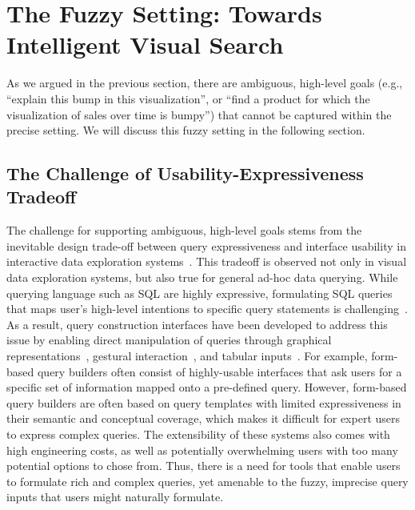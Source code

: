 \documentclass[11pt]{article}
\begin{document}
\section{The Fuzzy Setting: Towards Intelligent Visual Search}\label{sec:vague}
\par As we argued in the previous section, 
there are ambiguous, high-level goals (e.g., 
``explain this bump in this visualization'', or ``find a product
for which the visualization of sales over time is bumpy'') that
cannot be captured within the precise setting. We will discuss this fuzzy setting in the following section. 


\subsection{The Challenge of Usability-Expressiveness Tradeoff}
\par The challenge for supporting ambiguous, 
high-level goals stems from the 
inevitable design trade-off between 
query expressiveness and interface 
usability in interactive data exploration 
systems~\cite{Jagadish2007,Morton2014}. 
This tradeoff is observed not only in 
visual data exploration systems, 
but also true for general ad-hoc data querying. 
While querying language such as SQL are highly expressive, 
formulating SQL queries that maps user's high-level intentions 
to specific query statements is challenging~\cite{Jagadish2007,Khoussainova2010}. 
As a result, query construction interfaces 
have been developed to address this issue by enabling 
direct manipulation of queries through 
graphical representations~\cite{Abouzied2012}, 
gestural interaction~\cite{Nandi2013}, and 
tabular inputs~\cite{Embley1989,Zloof1975}. 
For example, form-based query builders 
often consist of highly-usable interfaces 
that ask users for a specific set of information 
mapped onto a pre-defined query. 
However, form-based query builders 
are often based on query templates 
with limited expressiveness 
in their semantic and conceptual coverage, 
which makes it difficult for expert users 
to express complex queries. 
The extensibility of these systems 
also comes with high engineering costs, 
as well as potentially overwhelming users 
with too many potential options to chose from. 
Thus, there is a need for tools that enable users 
to formulate rich and complex queries, 
yet amenable to the fuzzy, imprecise query 
inputs that users might naturally formulate. 
\end{document}

